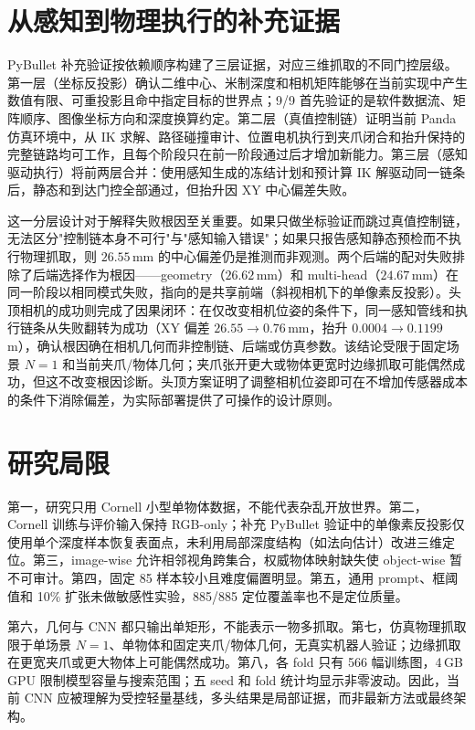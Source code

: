 \documentclass{l4proj}
\begin{document}
\section{从感知到物理执行的补充证据}
PyBullet 补充验证按依赖顺序构建了三层证据，对应三维抓取的不同门控层级。第一层（坐标反投影）确认二维中心、米制深度和相机矩阵能够在当前实现中产生数值有限、可重投影且命中指定目标的世界点；9/9 首先验证的是软件数据流、矩阵顺序、图像坐标方向和深度换算约定。第二层（真值控制链）证明当前 Panda 仿真环境中，从 IK 求解、路径碰撞审计、位置电机执行到夹爪闭合和抬升保持的完整链路均可工作，且每个阶段只在前一阶段通过后才增加新能力。第三层（感知驱动执行）将前两层合并：使用感知生成的冻结计划和预计算 IK 解驱动同一链条后，静态和到达门控全部通过，但抬升因 XY 中心偏差失败。

这一分层设计对于解释失败根因至关重要。如果只做坐标验证而跳过真值控制链，无法区分"控制链本身不可行"与"感知输入错误"；如果只报告感知静态预检而不执行物理抓取，则 $26.55$\,mm 的中心偏差仍是推测而非观测。两个后端的配对失败排除了后端选择作为根因——geometry（$26.62$\,mm）和 multi-head（$24.67$\,mm）在同一阶段以相同模式失败，指向的是共享前端（斜视相机下的单像素反投影）。头顶相机的成功则完成了因果闭环：在仅改变相机位姿的条件下，同一感知管线和执行链条从失败翻转为成功（XY 偏差 $26.55\rightarrow0.76$\,mm，抬升 $0.0004\rightarrow0.1199$\,m），确认根因确在相机几何而非控制链、后端或仿真参数。该结论受限于固定场景 $N=1$ 和当前夹爪/物体几何；夹爪张开更大或物体更宽时边缘抓取可能偶然成功，但这不改变根因诊断。头顶方案证明了调整相机位姿即可在不增加传感器成本的条件下消除偏差，为实际部署提供了可操作的设计原则。

\section{研究局限}
第一，研究只用 Cornell 小型单物体数据，不能代表杂乱开放世界。第二，Cornell 训练与评价输入保持 RGB-only；补充 PyBullet 验证中的单像素反投影仅使用单个深度样本恢复表面点，未利用局部深度结构（如法向估计）改进三维定位。第三，image-wise 允许相邻视角跨集合，权威物体映射缺失使 object-wise 暂不可审计。第四，固定 85 样本较小且难度偏置明显。第五，通用 prompt、框阈值和 10\% 扩张未做敏感性实验，885/885 定位覆盖率也不是定位质量。

第六，几何与 CNN 都只输出单矩形，不能表示一物多抓取。第七，仿真物理抓取限于单场景 $N=1$、单物体和固定夹爪/物体几何，无真实机器人验证；边缘抓取在更宽夹爪或更大物体上可能偶然成功。第八，各 fold 只有 566 幅训练图，4\,GB GPU 限制模型容量与搜索范围；五 seed 和 fold 统计均显示非零波动。因此，当前 CNN 应被理解为受控轻量基线，多头结果是局部证据，而非最新方法或最终架构。
\end{document}
